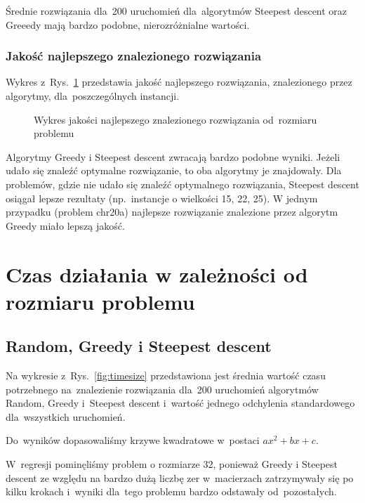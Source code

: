 \documentclass[a4paper,10pt]{article}
\begin{document}
Średnie rozwiązania dla~200 uruchomień dla~algorytmów Steepest descent oraz Greeedy mają bardzo podobne, nierozróżnialne wartości.

\subsubsection{Jakość najlepszego znalezionego rozwiązania}
Wykres z~Rys.~\ref{fig:qualityvssizemax} przedstawia jakość najlepszego rozwiązania, znalezionego przez algorytmy, dla~poszczególnych instancji.

\begin{figure}[!htpb]
\begin{center}

\caption{Wykres jakości najlepszego znalezionego rozwiązania od~rozmiaru problemu}
\label{fig:qualityvssizemax}
\end{center}
\end{figure}

Algorytmy Greedy i Steepest descent zwracają bardzo podobne wyniki.
Jeżeli udało się znaleźć optymalne rozwiązanie, to oba algorytmy je znajdowały.
Dla problemów, gdzie nie udało się znaleźć optymalnego rozwiązania, Steepest descent osiągał lepsze rezultaty (np.~instancje o wielkości 15, 22, 25).
W jednym przypadku (problem chr20a) najlepsze rozwiązanie znalezione przez algorytm Greedy miało lepszą jakość. 

\section{Czas działania w zależności od rozmiaru problemu}
\subsection{Random, Greedy i Steepest descent}
Na wykresie z~Rys.~\ref{fig:timesize} przedstawiona jest średnia wartość czasu potrzebnego na~znalezienie rozwiązania dla~200 uruchomień algorytmów Random, Greedy i~Steepest descent i~wartość jednego odchylenia standardowego dla~wszystkich uruchomień.

Do~wyników dopasowaliśmy krzywe kwadratowe w~postaci $ax^2+bx+c$.

W~regresji pominęliśmy problem o rozmiarze 32, ponieważ Greedy i Steepest descent ze względu na bardzo dużą liczbę zer
w~macierzach zatrzymywały się po kilku krokach i~wyniki dla~tego problemu bardzo odstawały od~pozostałych.

\end{document}
